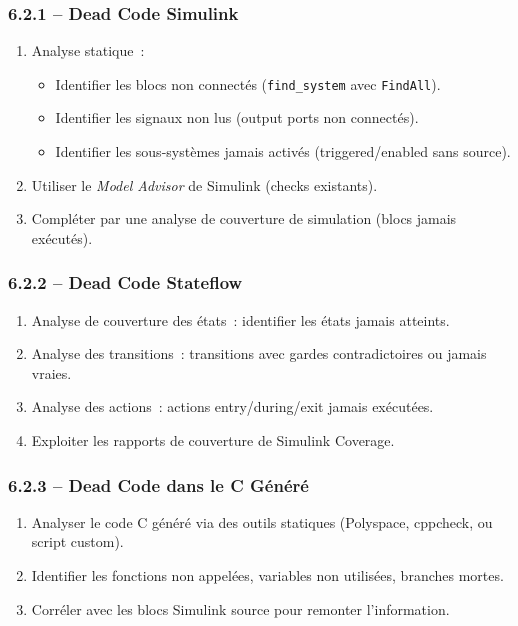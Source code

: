 \documentclass[a4paper,12pt]{article}
\begin{document}
\subsubsection{6.2.1 -- Dead Code Simulink}
\begin{enumerate}[nosep]
  \item Analyse statique~:
    \begin{itemize}[nosep]
      \item Identifier les blocs non connectés (\texttt{find\_system} avec \texttt{FindAll}).
      \item Identifier les signaux non lus (output ports non connectés).
      \item Identifier les sous-systèmes jamais activés (triggered/enabled sans source).
    \end{itemize}
  \item Utiliser le \textit{Model Advisor} de Simulink (checks existants).
  \item Compléter par une analyse de couverture de simulation (blocs jamais exécutés).
\end{enumerate}

\subsubsection{6.2.2 -- Dead Code Stateflow}
\begin{enumerate}[nosep]
  \item Analyse de couverture des états~: identifier les états jamais atteints.
  \item Analyse des transitions~: transitions avec gardes contradictoires ou jamais vraies.
  \item Analyse des actions~: actions entry/during/exit jamais exécutées.
  \item Exploiter les rapports de couverture de Simulink Coverage.
\end{enumerate}

\subsubsection{6.2.3 -- Dead Code dans le C Généré}
\begin{enumerate}[nosep]
  \item Analyser le code C généré via des outils statiques (Polyspace, cppcheck, ou script custom).
  \item Identifier les fonctions non appelées, variables non utilisées, branches mortes.
  \item Corréler avec les blocs Simulink source pour remonter l'information.
\end{enumerate}
\end{document}
